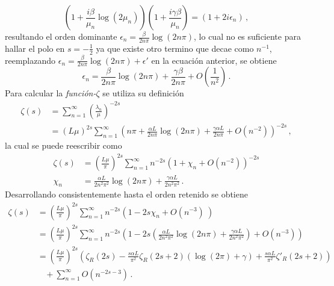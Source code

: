 \begin{equation}
\left( 1 + \frac{i \beta}{ \mu _n} \log ( 2 \mu _n) \right) 
\left(1 + \frac{i  \gamma \beta}{ \mu _n} \right)  =
(1 + 2 i \epsilon _n) \, ,
\end{equation}
resultando el orden dominante $\epsilon _n =  \frac{\beta }{2 n \pi}  \log (2 n \pi)$, lo cual no es suficiente para hallar el polo en $s=- \frac{1}{2}$ ya que existe otro termino que decae como $ n ^{-1}$, reemplazando $\epsilon _n =  \frac{\beta }{2 n \pi} \log (2 n \pi) + \epsilon '$ en la ecuación anterior, se obtiene
\begin{equation}\label{anterior}
    \epsilon _n =  \frac{\beta }{2 n \pi} \log (2 n \pi) +
                \frac{\gamma \beta}{2 n \pi} +
                O\left(  \frac{1}{n^2} \right)
                	\, .
\end{equation}
Para calcular la {\it función-$\zeta $} se utiliza su definición
\begin{equation}
\begin{aligned}
    \zeta (s) &= \sum _{n=1} ^{\infty} \left( \frac{\lambda _n}{\mu} \right) ^{-2 s}  \\
    & =    ( L \mu ) ^{2 s} \sum _{n=1} ^{\infty} 
    \left( 
    n \pi + \frac{\alpha L }{2 n \pi} \log (2 n \pi) + \frac{\gamma \alpha L}{2 n \pi} +
    O \left( n^{-2} \right)
    \right) ^{-2s}
    	\, ,
\end{aligned}
\end{equation}
la cual se puede reescribir como
\begin{equation}
\begin{aligned}
    \zeta  (s) &= \left( \frac{L \mu }{\pi} \right)  ^{2 s} 
    \sum _{n=1} ^{\infty} n ^{- 2  s} 
    \left(
    	1 + \chi _n  + O( n^{-2} )
    	\right) ^{-2 s} \\[5pt]
		 \chi _n &= 
    	\frac{\alpha L  }{2 n^2 \pi ^2} \log (2 n \pi) + 
    	\frac{\gamma \alpha L}{2 n^2 \pi ^2 }  
    			\, .
\end{aligned}
\end{equation}
Desarrollando consistentemente hasta el orden retenido se obtiene
\begin{align}\label{eq.zeta.c}
    \zeta  (s) &= \left( \frac{L \mu}{\pi} \right) ^{2 s}
    \sum _{n=1} ^{\infty} 
    n ^{-2s}
    \left(
    1 - 2 s \chi _n + O \left( n ^{-3} \right) \
    \right)   \nonumber \\[5pt]
     &= \left( \frac{L \mu }{\pi} \right) ^{2 s}
    \sum _{n=1} ^{\infty} n ^{-2 s} 
    \left(
    1 - 2s \left(
    \frac{\alpha L }{2 n ^2 \pi ^2} \log ( 2  n \pi) + 
    \frac{\gamma \alpha L }{2 n ^2 \pi ^2} 
	\right) +
    O \left( n ^{-3}   \right)
    \right) \nonumber \\[5pt]
    &=   \left( \frac{L \mu }{ \pi } \right) ^{2 s}  
    \left( \zeta _R (2 s) -
	\frac{ s \alpha L}{ \pi ^2} \zeta _R (2s+2)
	\left(
	    \log (2  \pi ) + \gamma
	\right) + 
    \frac{s \alpha L}{\pi ^2}
	\zeta ' _R(2s+2) \right) \nonumber \\[5pt]
	&\ \ \ \  + \sum _{n=1} ^{\infty} O \left( n ^{-2s-3} \right) \, .
\end{align}    
